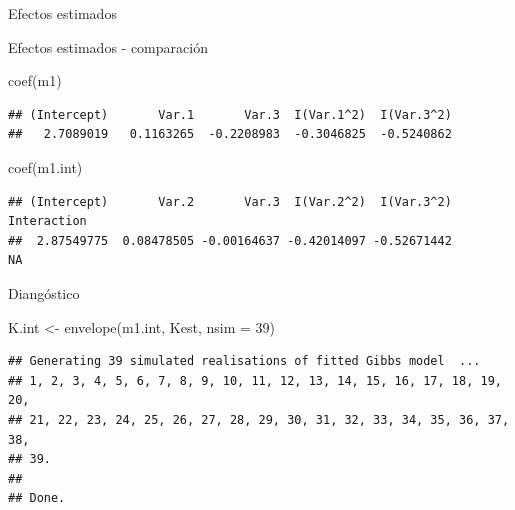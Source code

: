 \documentclass[
  11pt,
  ignorenonframetext,
]{beamer}
\newenvironment{Shaded}{}{}
\newcommand{\AttributeTok}[1]{\textcolor[rgb]{0.49,0.56,0.16}{#1}}
\newcommand{\DecValTok}[1]{\textcolor[rgb]{0.25,0.63,0.44}{#1}}
\newcommand{\FunctionTok}[1]{\textcolor[rgb]{0.02,0.16,0.49}{#1}}
\newcommand{\NormalTok}[1]{#1}
\newcommand{\OtherTok}[1]{\textcolor[rgb]{0.00,0.44,0.13}{#1}}
\newcommand{\SpecialCharTok}[1]{\textcolor[rgb]{0.25,0.44,0.63}{#1}}
\begin{document}
\begin{frame}[fragile]{Efectos estimados}
\protect\hypertarget{efectos-estimados}{}
\begin{Shaded}
\end{Shaded}
\end{frame}

\begin{frame}[fragile]{Efectos estimados - comparación}
\protect\hypertarget{efectos-estimados---comparaciuxf3n}{}
\begin{Shaded}
\begin{Highlighting}[]
\FunctionTok{coef}\NormalTok{(m1)}
\end{Highlighting}
\end{Shaded}

\begin{verbatim}
## (Intercept)       Var.1       Var.3  I(Var.1^2)  I(Var.3^2) 
##   2.7089019   0.1163265  -0.2208983  -0.3046825  -0.5240862
\end{verbatim}

\begin{Shaded}
\begin{Highlighting}[]
\FunctionTok{coef}\NormalTok{(m1.int)}
\end{Highlighting}
\end{Shaded}

\begin{verbatim}
## (Intercept)       Var.2       Var.3  I(Var.2^2)  I(Var.3^2) Interaction 
##  2.87549775  0.08478505 -0.00164637 -0.42014097 -0.52671442          NA
\end{verbatim}
\end{frame}

\begin{frame}[fragile]{Diangóstico}
\protect\hypertarget{dianguxf3stico}{}
\begin{Shaded}
\begin{Highlighting}[]
\NormalTok{K.int }\OtherTok{\textless{}{-}} \FunctionTok{envelope}\NormalTok{(m1.int, Kest, }\AttributeTok{nsim =} \DecValTok{39}\NormalTok{)}
\end{Highlighting}
\end{Shaded}

\begin{verbatim}
## Generating 39 simulated realisations of fitted Gibbs model  ...
## 1, 2, 3, 4, 5, 6, 7, 8, 9, 10, 11, 12, 13, 14, 15, 16, 17, 18, 19, 20,
## 21, 22, 23, 24, 25, 26, 27, 28, 29, 30, 31, 32, 33, 34, 35, 36, 37, 38, 
## 39.
## 
## Done.
\end{verbatim}
\end{frame}
\end{document}

